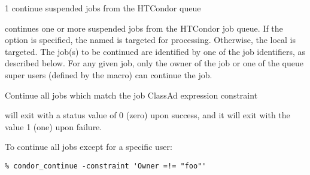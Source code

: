 \begin{ManPage}{\label{man-condor-continue}}{1}
{continue suspended jobs from the HTCondor queue}
\Synopsis {}
\ToolArgsBase

\ToolDebugOption
\ToolLocate
{}



\Description

 continues one or more suspended jobs from the HTCondor job queue.  
If the  option is specified, the named  is targeted
for processing.  
Otherwise, the local  is targeted.
The job(s) to be continued are identified by one of the job identifiers,
as described below.
For any given job, only the owner of the job or one of the queue super users
(defined by the  macro) can continue the job.

\begin{Options}
	\ToolArgsBaseDesc
	\ToolLocateDesc
    \ToolDebugDesc
	 {Continue all jobs which match
	                the job ClassAd expression constraint}
\end{Options}

\ExitStatus

 will exit with a status value of 0 (zero) upon success,
and it will exit with the value 1 (one) upon failure.

\Examples
To continue all jobs except for a specific user:
\footnotesize
\begin{verbatim}
% condor_continue -constraint 'Owner =!= "foo"'
\end{verbatim}
\normalsize

\end{ManPage}
